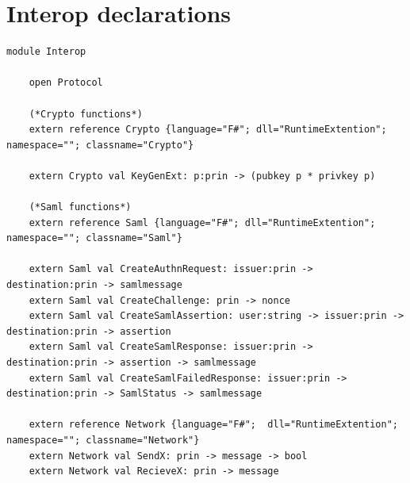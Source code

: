 \documentclass[twosided]{report}
\begin{document}
\section{Interop declarations}
\begin{lstlisting}[style=fstar, caption={Example of how to interop with .NET \cite{jacob}.}]
	module Interop

	open Protocol
	
	(*Crypto functions*)
	extern reference Crypto {language="F#"; dll="RuntimeExtention"; namespace=""; classname="Crypto"}
	
	extern Crypto val KeyGenExt: p:prin -> (pubkey p * privkey p)
	
	(*Saml functions*)
	extern reference Saml {language="F#"; dll="RuntimeExtention"; namespace=""; classname="Saml"}
	
	extern Saml val CreateAuthnRequest: issuer:prin -> destination:prin -> samlmessage
	extern Saml val CreateChallenge: prin -> nonce
	extern Saml val CreateSamlAssertion: user:string -> issuer:prin -> destination:prin -> assertion
	extern Saml val CreateSamlResponse: issuer:prin -> destination:prin -> assertion -> samlmessage
	extern Saml val CreateSamlFailedResponse: issuer:prin -> destination:prin -> SamlStatus -> samlmessage
	
	extern reference Network {language="F#";  dll="RuntimeExtention"; namespace=""; classname="Network"}
	extern Network val SendX: prin -> message -> bool
	extern Network val RecieveX: prin -> message
\end{lstlisting}
\clearpage
\end{document}
